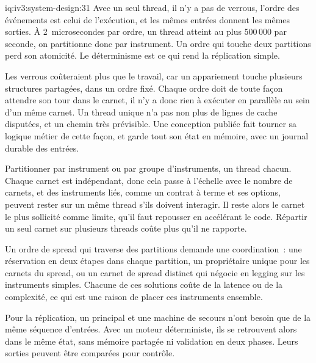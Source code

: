\begin{solution}{iq:iv3:system-design:31}
Avec un seul thread, il n'y a pas de verrous, l'ordre des événements est celui de l'exécution, et les mêmes entrées donnent les mêmes sorties. À 2~microsecondes par ordre, un thread atteint au plus 500\,000 par seconde, on partitionne donc par instrument. Un ordre qui touche deux partitions perd son atomicité. Le déterminisme est ce qui rend la réplication simple.

Les verrous coûteraient plus que le travail, car un appariement touche plusieurs structures partagées, dans un ordre fixé. Chaque ordre doit de toute façon attendre son tour dans le carnet, il n'y a donc rien à exécuter en parallèle au sein d'un même carnet. Un thread unique n'a pas non plus de lignes de cache disputées, et un chemin très prévisible. Une conception publiée fait tourner sa logique métier de cette façon, et garde tout son état en mémoire, avec un journal durable des entrées.

Partitionner par instrument ou par groupe d'instruments, un thread chacun. Chaque carnet est indépendant, donc cela passe à l'échelle avec le nombre de carnets, et des instruments liés, comme un contrat à terme et ses options, peuvent rester sur un même thread s'ils doivent interagir. Il reste alors le carnet le plus sollicité comme limite, qu'il faut repousser en accélérant le code. Répartir un seul carnet sur plusieurs threads coûte plus qu'il ne rapporte.

Un ordre de spread qui traverse des partitions demande une coordination~: une réservation en deux étapes dans chaque partition, un propriétaire unique pour les carnets du spread, ou un carnet de spread distinct qui négocie en legging sur les instruments simples. Chacune de ces solutions coûte de la latence ou de la complexité, ce qui est une raison de placer ces instruments ensemble.

Pour la réplication, un principal et une machine de secours n'ont besoin que de la même séquence d'entrées. Avec un moteur déterministe, ils se retrouvent alors dans le même état, sans mémoire partagée ni validation en deux phases. Leurs sorties peuvent être comparées pour contrôle.

\end{solution}

